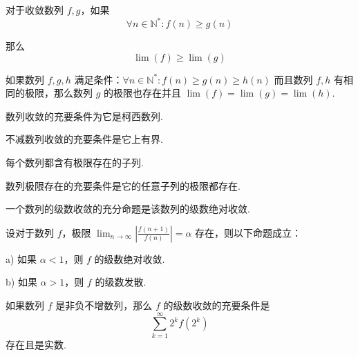 \begin{theorem}
    对于收敛数列 $f,g$，如果
    \[\forall n \in \mathbb{N}^*: f(n) \geqslant g(n)\]

    那么
    \[\lim(f) \geqslant \lim(g)\]
\end{theorem}\vspace{9pt}

\begin{theorem}
    如果数列 $f,g,h$ 满足条件：$\forall n \in \mathbb{N}^*: f(n) \geqslant g(n) \geqslant h(n)$ 而且数列 $f,h$ 有相同的极限，那么数列 $g$ 的极限也存在并且 $\lim(f) = \lim(g) = \lim(h)$.
\end{theorem}\vspace{9pt}

\begin{theorem}
    数列收敛的充要条件为它是柯西数列.
\end{theorem}\vspace{9pt}

\begin{theorem}
    不减数列收敛的充要条件是它上有界.
\end{theorem}\vspace{9pt}

\begin{theorem}
    每个数列都含有极限存在的子列.
\end{theorem}\vspace{9pt}

\begin{theorem}
    数列极限存在的充要条件是它的任意子列的极限都存在.
\end{theorem}\vspace{9pt}

\begin{theorem}
    一个数列的级数收敛的充分命题是该数列的级数绝对收敛.
\end{theorem}\vspace{9pt}

\begin{theorem}
    设对于数列 $f$，极限 $\displaystyle \lim_{n \rightarrow \infty} \left| \frac{f(n+1)}{f(n)}\right| = \alpha$ 存在，则以下命题成立：

    a) 如果 $\alpha < 1$，则 $f$ 的级数绝对收敛.

    b) 如果 $\alpha > 1$，则 $f$ 的级数发散.
\end{theorem}\vspace{9pt}

\begin{theorem}
    如果数列 $f$ 是非负不增数列，那么 $f$ 的级数收敛的充要条件是
    \[\sum_{k=1}^{\infty} 2^k f(2^k)\]
    存在且是实数.
\end{theorem}\vspace{9pt}

